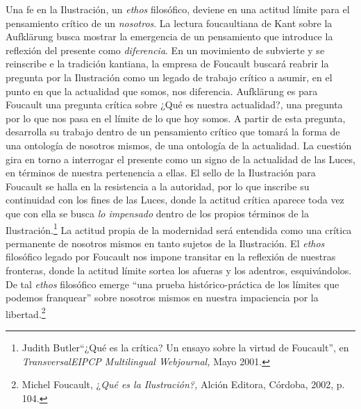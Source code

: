 Una fe en la Ilustración, un \emph{ethos} filosófico, deviene en una actitud límite para el pensamiento crítico de un \emph{nosotros}. La lectura foucaultiana de Kant sobre la Aufklärung busca mostrar la emergencia de un pensamiento que introduce la reflexión del presente como \emph{diferencia}. En un movimiento de subvierte y se reinscribe e la tradición kantiana, la empresa de Foucault buscará reabrir la pregunta por la Ilustración como un legado de trabajo crítico a asumir, en el punto en que la actualidad que somos, nos diferencia. Aufklärung es para Foucault una pregunta crítica sobre ¿Qué es nuestra actualidad?, una pregunta por lo que nos pasa en el límite de lo que hoy somos. A partir de esta pregunta, desarrolla su trabajo dentro de un pensamiento crítico que tomará la forma de una ontología de nosotros mismos, de una ontología de la actualidad. La cuestión gira en torno a interrogar el presente como un signo de la actualidad de las Luces, en términos de nuestra pertenencia a ellas. El sello de la Ilustración para Foucault se halla en la resistencia a la autoridad, por lo que inscribe su continuidad con los fines de las Luces, donde la actitud crítica aparece toda vez que con ella se busca \emph{lo impensado} dentro de los propios términos de la Ilustración.\footnote{Judith Butler\enquote{¿Qué es la crítica? Un ensayo sobre la virtud de Foucault}, en \emph{TransversalEIPCP Multilingual Webjournal,} Mayo 2001.} La actitud propia de la modernidad será entendida como una crítica permanente de nosotros mismos en tanto sujetos de la Ilustración. El \emph{ethos} filosófico legado por Foucault nos impone transitar en la reflexión de nuestras fronteras, donde la actitud límite sortea los afueras y los adentros, esquivándolos. De tal \emph{ethos} filosófico emerge \enquote{una prueba histórico-práctica de los límites que podemos franquear} sobre nosotros mismos en nuestra impaciencia por la libertad.\footnote{Michel Foucault, ¿\emph{Qué es la Ilustración?,} Alción Editora, Córdoba, 2002, p. 104.}

